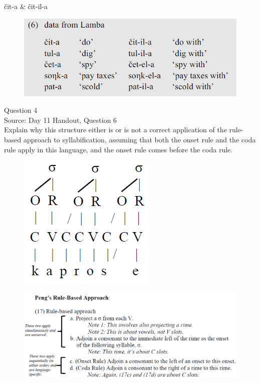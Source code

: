 \documentclass[12pt]{article}
\begin{document}
čit-a \& čit-il-a

\begin{figure}[H]
\includegraphics{../images/peng119_lamba.png}
\end{figure}

\newpage

{\large Question 4}\\

Source: Day 11 Handout, Question 6\\

Explain why this structure either is or is not a correct application of the rule-based approach to syllabification, assuming that both the onset rule and the coda rule apply in this language, and the onset rule comes before the coda rule.\\

\begin{figure}[H]
\includegraphics{../images/pengrules_kaprosse_yes.png}
\end{figure}
\begin{figure}[H]
\includegraphics{../images/peng_rules.png}
\end{figure}
\end{document}
